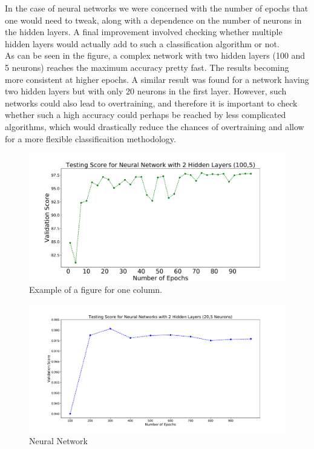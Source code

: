 In the case of neural networks we were concerned with the number of epochs that one would need to tweak, along with a dependence on the number of neurons in the hidden layers. A final improvement involved checking whether multiple hidden layers would actually add to such a classification algorithm or not.\\
As can be seen in the figure, a complex network with two hidden layers (100 and 5 neurons) reaches the maximum accuracy pretty fast. The results becoming more consistent at higher epochs. A similar result was found for a network having two hidden layers but with only 20 neurons in the first layer. However, such networks could also lead to overtraining, and therefore it is important to check whether such a high accuracy could perhaps be reached by less complicated algorithms, which would drastically reduce the chances of overtraining and allow for a more flexible classificaition methodology.\\
\begin{figure}[h]
\includegraphics[width=\onepic\textwidth]{epochsvsscore_10seeds_100_2}
\caption{
Example of a figure for one column.
}
\label{fig:Maps_data}
\end{figure}

\begin{figure}[h]
\includegraphics[width=\onepic\textwidth]{epochsvsscore3_10seeds.pdf}
\caption{
Neural Network
}
\label{fig:Maps_data}
\end{figure}

